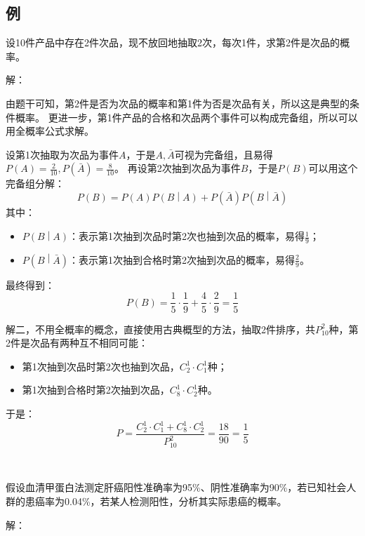 \subsection{例}

\begin{example}
设10件产品中存在2件次品，现不放回地抽取2次，每次1件，求第2件是次品的概率。
\end{example}

解：

由题干可知，第2件是否为次品的概率和第1件为否是次品有关，所以这是典型的条件概率。
更进一步，第1件产品的合格和次品两个事件可以构成完备组，所以可以用全概率公式求解。

设第1次抽取为次品为事件$A$，于是$A,\bar{A}$可视为完备组，且易得$P\left( A \right) =\frac{2}{10},P\left( \bar{A} \right) =\frac{8}{10}$。
再设第2次抽到次品为事件$B$，于是$P\left( B \right) $可以用这个完备组分解：
\[
P\left( B \right) =P\left( A \right) P\left( B \middle| A \right) +P\left( \bar{A} \right) P\left( B \middle| \bar{A} \right)
\]
其中：
\begin{itemize}
    \item $P\left( B \middle| A \right) $：表示第1次抽到次品时第2次也抽到次品的概率，易得$\frac{1}{9}$；
    \item $P\left( B \middle| \bar{A} \right) $：表示第1次抽到合格时第2次抽到次品的概率，易得$\frac{2}{9}$。
\end{itemize}
最终得到：
\[
P\left( B \right) =\frac{1}{5}\cdot \frac{1}{9}+\frac{4}{5}\cdot \frac{2}{9}=\frac{1}{5}
\]

解二，不用全概率的概念，直接使用古典概型的方法，抽取2件排序，共$P_{10}^{2}$种，第2件是次品有两种互不相同可能：
\begin{itemize}
    \item 第1次抽到次品时第2次也抽到次品，$C_{2}^{1}\cdot C_{1}^{1}$种；
    \item 第1次抽到合格时第2次抽到次品，$C_{8}^{1}\cdot C_{2}^{1}$种。
\end{itemize}
于是：
\[
P=\frac{C_{2}^{1}\cdot C_{1}^{1}+C_{8}^{1}\cdot C_{2}^{1}}{P_{10}^{2}}=\frac{18}{90}=\frac{1}{5}
\]

~

\begin{example}
假设血清甲蛋白法测定肝癌阳性准确率为95\%、阴性准确率为90\%，若已知社会人群的患癌率为0.04\%，若某人检测阳性，分析其实际患癌的概率。
\end{example}

解：

